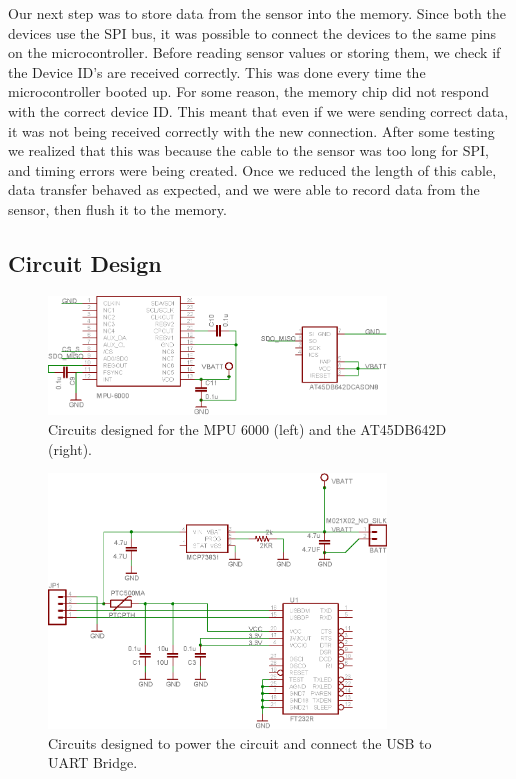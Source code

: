 Our next step was to store data from the sensor into the memory.
Since both the devices use the SPI bus,
it was possible to connect the devices to the same pins on the microcontroller.
Before reading sensor values or storing them,
we check if the Device ID's are received correctly.
This was done every time the microcontroller booted up.
For some reason, the memory chip did not respond with the correct device ID.
This meant that even if we were sending correct data,
it was not being received correctly with the new connection.
After some testing we realized that this was because the cable to the sensor was too long for SPI,
and timing errors were being created.
Once we reduced the length of this cable,
data transfer behaved as expected,
and we were able to record data from the sensor,
then flush it to the memory.

\subsection{Circuit Design}
\label{Sec:CircuitDesign}

\begin{figure}
\begin{center}
\includegraphics[width=0.8\textwidth]{images/MPU6000Circuit.eps}
\caption{Circuits designed for the MPU 6000 (left) and the AT45DB642D (right).}
\label{Fig:MPUCkt}
\end{center}
\end{figure}

\begin{figure}
\begin{center}
\includegraphics[width=0.8\textwidth]{images/USBPOWER.eps}
\caption{Circuits designed to power the circuit and connect the USB to UART Bridge.}
\label{Fig:USBPOWER}
\end{center}
\end{figure}

